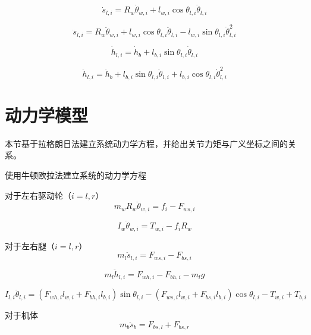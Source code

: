 \begin{equation}
\dot{s}_{l,i} = R_w\dot{\theta}_{w,i} + l_{w,i}\cos\theta_{l,i}\dot{\theta}_{l,i} 
\end{equation}

\begin{equation}
\ddot{s}_{l,i} = R_w\ddot{\theta}_{w,i} + l_{w,i}\cos\theta_{l,i}\ddot{\theta}_{l,i} - l_{w,i}\sin\theta_{l,i}\dot{\theta}_{l,i}^2 
\end{equation}

\begin{equation}
\dot{h}_{l,i} = \dot{h}_b + l_{b,i}\sin\theta_{l,i}\dot{\theta}_{l,i} 
\end{equation}

\begin{equation}
\ddot{h}_{l,i} = \ddot{h}_b + l_{b,i}\sin\theta_{l,i}\ddot{\theta}_{l,i} + l_{b,i}\cos\theta_{l,i}\dot{\theta}_{l,i}^2 
\end{equation}

\section{动力学模型}

本节基于拉格朗日法建立系统动力学方程，并给出关节力矩与广义坐标之间的关系。

使用牛顿欧拉法建立系统的动力学方程

对于左右驱动轮（$i = l, r$）
\begin{equation}
m_w R_w \ddot{\theta}_{w,i} = f_i - F_{ws,i} 
\end{equation}

\begin{equation}
I_w \ddot{\theta}_{w,i} = T_{w,i} - f_i R_w
\end{equation}

对于左右腿（$i = l, r$）
\begin{equation}
m_l \ddot{s}_{l,i} = F_{ws,i} - F_{bs,i} 
\end{equation}

\begin{equation}
m_l \ddot{h}_{l,i} = F_{wh,i} - F_{bh,i} - m_l g 
\end{equation}

\begin{equation}
I_{l,i} \ddot{\theta}_{l,i} = (F_{wh,i} l_{w,i} + F_{bh,i} l_{b,i}) \sin\theta_{l,i} - (F_{ws,i} l_{w,i} + F_{bs,i} l_{b,i}) \cos\theta_{l,i} - T_{w,i} + T_{b,i} 
\end{equation}

对于机体
\begin{equation}
m_b \ddot{s}_b = F_{bs,l} + F_{bs,r} 
\end{equation}

